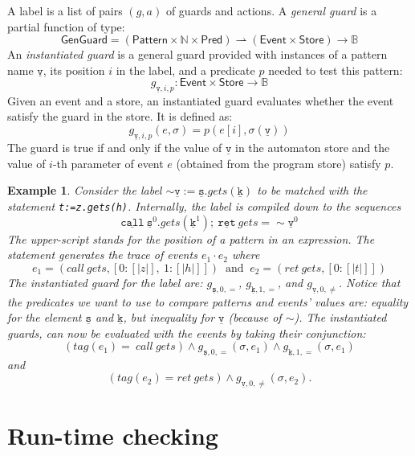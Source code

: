 \documentclass{sigplanconf}[10pt] %
\newcommand{\B}{\ensuremath{\mathbb{B}}}
\newcommand{\N}{\ensuremath{\mathbb{N}}}
\newcommand{\pattern}[1]{\ensuremath{\mathtt{\underline{#1}}}}
\newcommand{\pmap}{\rightharpoonup}
\newcommand{\set}[1]{\ensuremath{\mathsf{#1}}}
\newtheorem{example}{Example}
\begin{document}
A label is a list of pairs $(g,a)$ of guards and actions. A  {\em general guard} is a partial function of type:
\[
\set{GenGuard} = (\set{Pattern} \times \N \times \set{Pred}) \pmap (\set{Event}\times\set{Store}) \to \B
\]
An {\em instantiated guard} is a general guard provided with instances of a pattern  name $\pattern v$,  its position $i$ in the label, and a predicate $p$ needed to test this pattern:
\[
g_{\pattern{v},i,p} : \set{Event}\times\set{Store} \to \B
\]
Given an event and a store, an instantiated guard  evaluates whether the event satisfy the guard in the store. It is defined as:
\newcommand{\sem}[1]{[ \! | #1 | \! ]}
\[
g_{\pattern{v},i,p}(e, \sigma) = p(e[i],\sigma(\pattern v))
\] The guard is true if and only if the value of $\pattern{v}$ in the automaton store
and the value of $i$-th parameter of  event $e$ (obtained from the program store) satisfy $p$.
\begin{example}
Consider the label
 $\sim \pattern {v} := \pattern {s}.gets(\pattern {k})$ to be matched with the statement
 {\tt t:=z.gets(h)}. Internally,  the label is compiled down to the sequences
\[
\pattern{call} \  \pattern{s}^0 .gets(\pattern {k}^1);  \ \pattern{ret} \ gets = \sim \pattern {v}^0
\] The upper-script stands for the position of a pattern in an expression. The statement generates the trace of events $e_1 \cdot e_2$ where
\[
 e_1=(call \ gets, [0: \sem{z}, \ 1: \sem{h}])  \ \mbox{ and }  \  e_2= (ret \ gets, [0: \sem{t}])
\]
The instantiated guard for the label are:
 $g_{\pattern{s},0,=}$, $g_{\pattern{k},1,=}$, and  $g_{\pattern{v},0, \neq}$.
Notice that the predicates we want to use to compare patterns and events' values are: equality for the element $\pattern{s}$ and $\pattern{k}$,
but inequality for \pattern{v} (because of $\sim$).
The instantiated guards, can now be evaluated with the events by taking their conjunction:
\[
 (tag(e_1)= \ call \ gets) \wedge g_{\pattern{s},0,=}(\sigma,e_1) \wedge g_{\pattern{k},1,=}(\sigma, e_1)
\] and
\[
 (tag(e_2)= ret \ gets) \wedge g_{\pattern{v},0,\neq}(\sigma,e_2).
\]
\end{example}

\section{Run-time checking} \label{sec:dynamic} %
\end{document}
